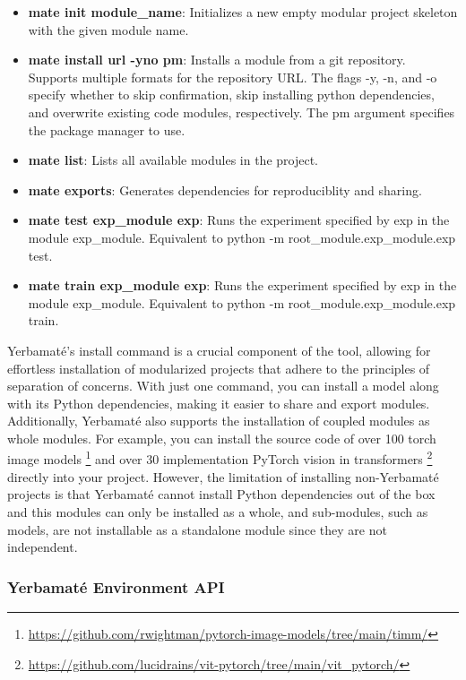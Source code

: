 \documentclass{IEEEtran}
\begin{document}
\begin{itemize}
\item \textbf{mate init module\_name}: Initializes a new empty modular project skeleton with the given module name. 

\item \textbf{mate install url -y\textbar n\textbar o pm}: Installs a module from a git repository. Supports multiple formats for the repository URL. The flags -y, -n, and -o specify whether to skip confirmation, skip installing python dependencies, and overwrite existing code modules, respectively. The pm argument specifies the package manager to use.
\item \textbf{mate list}: Lists all available modules in the project. 
\item \textbf{mate exports}: Generates dependencies for reproduciblity and sharing.
\item \textbf{mate test exp\_module exp}: Runs the experiment specified by exp in the module exp\_module. Equivalent to python -m root\_module.exp\_module.exp test.
\item \textbf{mate train exp\_module exp}: Runs the experiment specified by exp in the module exp\_module. Equivalent to python -m root\_module.exp\_module.exp train.
\end{itemize}



Yerbamaté's install command is a crucial component of the tool, allowing for effortless installation of modularized projects that adhere to the principles of separation of concerns. With just one command, you can install a model along with its Python dependencies, making it easier to share and export modules. Additionally, Yerbamaté also supports the installation of coupled modules as whole modules. For example, you can install the source code of over 100 torch image models \footnote{\url{https://github.com/rwightman/pytorch-image-models/tree/main/timm/}} and over 30 implementation PyTorch vision in transformers \footnote{\url{https://github.com/lucidrains/vit-pytorch/tree/main/vit\_pytorch/}} directly into your project. However, the limitation of installing non-Yerbamaté projects is that Yerbamaté cannot install Python dependencies out of the box and this modules can only be installed as a whole, and sub-modules, such as models, are not installable as a standalone module since they are not independent.





\subsubsection{Yerbamaté Environment API}
\end{document}
